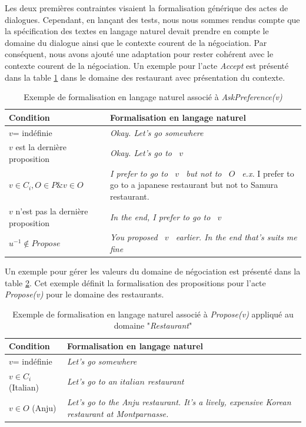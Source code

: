 Les deux premières contraintes visaient la formalisation générique des actes de dialogues. Cependant, en lançant des tests, nous nous sommes rendus compte que la spécification des textes en langage naturel devait prendre en compte le domaine du dialogue ainsi que le contexte courent de la négociation. 
Par conséquent, nous avons ajouté une adaptation pour rester cohérent avec le contexte courent de la négociation. Un exemple pour l'acte \emph{Accept} est présenté dans la table \ref{tab:AcceptEx} dans le domaine des restaurant avec présentation du contexte.

\begin{table} [h]
	\centering
	\begin{tabular} {p{4cm}| p{6.5cm}}
		\hline
		\hline
		\textbf{Condition} & \textbf{Formalisation en langage naturel} \\
		\hline
		$v$= indéfinie & \textit{Okay. Let's go somewhere} \\
		\hline
		$ v $ est la dernière proposition  & \textit{Okay. Let's go to \ $v$ \ } \\
		\hline
		$ v \in C_i,  O \in P  \& v \in O$ & \textit{I prefer to go to \ $v$ \, but not to \ $O$\ }
		\newline \emph{e.x.} I prefer to go to a japanese restaurant but not to Samura restaurant. \\
		\hline
		$ v $ n'est pas la dernière proposition & \textit{In the end, I prefer to go to  \ $v$ \ } \\
		\hline
		$u^{-1} \not \in Propose$ & \textit{You proposed  \ $v$ \ earlier. In the end that's suits me fine} \\
		\hline
		\hline
	\end{tabular}
	\caption{\label{tab:AcceptEx} Exemple de formalisation en langage naturel associé à \emph{AskPreference(v)}}
\end{table}

Un exemple pour gérer les valeurs du domaine de négociation est présenté dans la table \ref{tab:ProposeEx}. Cet exemple définit la formalisation des propositions pour l'acte \emph{Propose(v)} pour le domaine des restaurants.
\begin{table} [h]
	\centering
	\begin{tabular} {p{3.5cm} p{7cm}}
		\hline
		\hline
		\textbf{Condition} & \textbf{Formalisation en langage naturel} \\
		\hline
		$v$= indéfinie & \textit{Let's go somewhere } \\
		\hline
		$ v \in C_i$ (Italian)  & \textit{Let's go to an $italian$ restaurant} \\
		\hline
		$v \in O$ (Anju) & \textit{Let's go to the Anju restaurant. It's a lively, expensive Korean restaurant at Montparnasse.}\\
		\hline
		\hline
	\end{tabular}
	\caption{\label{tab:ProposeEx} Exemple de formalisation en langage naturel associé à \emph{Propose(v)} appliqué au domaine "\textit{Restaurant}"}
\end{table}


